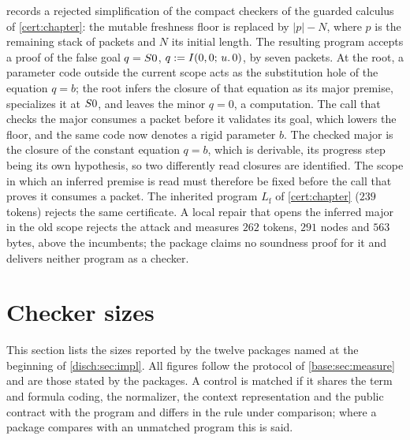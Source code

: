 \begin{remark}
\label{disch:rem:packet-floor}
 records a rejected simplification of the compact
checkers of the guarded calculus of \cref{cert:chapter}: the mutable
freshness floor is replaced by $|p|-N$, where $p$ is the remaining stack of
packets and $N$ its initial length. The resulting program accepts a proof of
the false goal $q=S 0$, $q\mathrel{:=}I(0,0;\,u.\,0)$, by seven packets. At the
root, a parameter code outside the current scope acts as the substitution
hole of the equation $q=b$; the root infers the closure of that equation as
its major premise, specializes it at $S 0$, and leaves the minor $q=0$,
a computation. The call that checks the major consumes a packet before it
validates its goal, which lowers the floor, and the same code now denotes a
rigid parameter $b$. The checked major is the closure of the constant
equation $q=b$, which is derivable, its progress step being its own
hypothesis, so two differently read closures are identified. The scope in
which an inferred premise is read must therefore be fixed before the call
that proves it consumes a packet. The inherited program $L_{\mathrm f}$ of
\cref{cert:chapter} ($239$ tokens) rejects the same certificate. A local
repair that opens the inferred major in the old scope rejects the attack and
measures $262$ tokens, $291$ nodes and $563$ bytes, above the incumbents; the
package claims no soundness proof for it and delivers neither program as a
checker.
\end{remark}

\section{Checker sizes}
\label{disch:sec:sizes}

This section lists the sizes reported by the twelve packages named at the
beginning of \cref{disch:sec:impl}. All figures follow the protocol of
\cref{base:sec:measure} and are those stated by the packages. A control is
matched if it shares the term and
formula coding, the normalizer, the context representation and the public
contract with the program and differs in the rule under comparison; where
a package compares with an unmatched program this is said.

